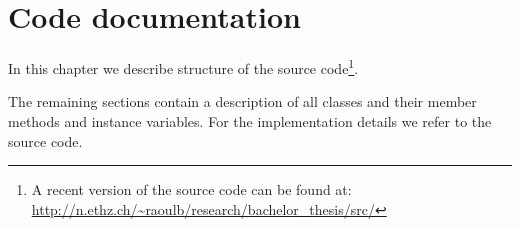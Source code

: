 \chapter{Code documentation}

In this chapter we describe structure of the source code\footnote{
A recent version of the source code can be found at:\\
\url{http://n.ethz.ch/~raoulb/research/bachelor_thesis/src/}
}.

The remaining sections contain a description of all classes and their member
methods and instance variables. For the implementation details we refer to
the source code.
























